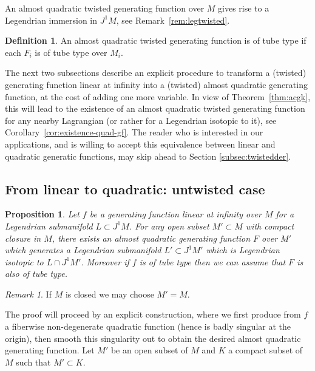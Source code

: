 \documentclass[reqno]{amsart}
\theoremstyle{theorem}
\newtheorem{proposition}[corollary]{Proposition}
\theoremstyle{remark}
\newtheorem{remark}[corollary]{Remark}
\theoremstyle{definition}
\newtheorem{definition}[corollary]{Definition}
\begin{document}
An almost quadratic twisted generating function over $M$ gives rise to a Legendrian immersion in $J^1 M$, see Remark~\ref{rem:legtwisted}.


\begin{definition}
An almost quadratic twisted generating function is of tube type if each $F_i$ is of tube type over $M_i$.
\end{definition}


The next two subsections describe an explicit procedure to transform a (twisted) generating function linear at infinity
into a (twisted) almost quadratic generating function, at the cost of adding one more variable.
In view of Theorem~\ref{thm:acgk}, this will lead to the existence of an almost quadratic twisted generating function
for any nearby Lagrangian (or rather for a Legendrian isotopic to it), see Corollary~\ref{cor:existence-quad-gf}. The reader who is interested in our applications, and is willing to accept this equivalence between linear and quadratic generatic functions, may skip ahead to Section \ref{subsec:twistedder}.


\subsection{From linear to quadratic: untwisted case}




\begin{proposition} \label{prop:quadratic_generating_function}
Let $f$ be a generating function linear at infinity over $M$ for a Legendrian submanifold $L \subset J^1M$. For any open subset $M' \subset M$ with compact closure in $M$, there exists an almost quadratic generating function $F$ over $M'$ which generates
a Legendrian submanifold $L' \subset J^1M'$ which is Legendrian isotopic to $L \cap J^1M'$.
Moreover if $f$ is of tube type then we can assume that $F$ is also of tube type.
\end{proposition}




\begin{remark}
If $M$ is closed we may choose $M'=M$.
\end{remark}


The proof will proceed by an explicit construction, where we first produce from $f$ a fiberwise non-degenerate quadratic function (hence is badly singular at the origin), then smooth this singularity out to obtain the desired almost quadratic generating function. Let $M'$ be an open subset of $M$ and $K$ a compact subset of $M$ such that $M'\subset K$.
\end{document}
